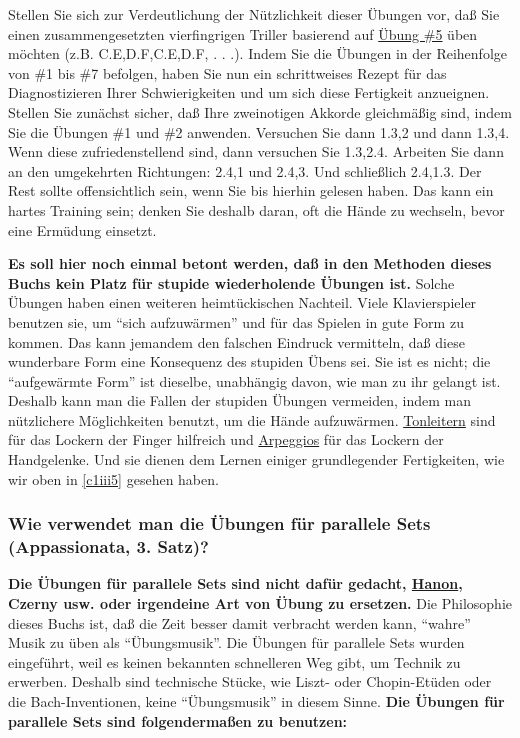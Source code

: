 Stellen Sie sich zur Verdeutlichung der Nützlichkeit dieser Übungen vor, daß Sie einen zusammengesetzten vierfingrigen Triller basierend auf \hyperref[c1iii7b5]{Übung \#5} üben möchten (z.B. C.E,D.F,C.E,D.F, . . .).
Indem Sie die Übungen in der Reihenfolge von \#1 bis \#7 befolgen, haben Sie nun ein schrittweises Rezept für das Diagnostizieren Ihrer Schwierigkeiten und um sich diese Fertigkeit anzueignen.
Stellen Sie zunächst sicher, daß Ihre zweinotigen Akkorde gleichmäßig sind, indem Sie die Übungen \#1 und \#2 anwenden.
Versuchen Sie dann 1.3,2 und dann 1.3,4.
Wenn diese zufriedenstellend sind, dann versuchen Sie 1.3,2.4.
Arbeiten Sie dann an den umgekehrten Richtungen: 2.4,1 und 2.4,3. Und schließlich 2.4,1.3.
Der Rest sollte offensichtlich sein, wenn Sie bis hierhin gelesen haben.
Das kann ein hartes Training sein; denken Sie deshalb daran, oft die Hände zu wechseln, bevor eine Ermüdung einsetzt.

\textbf{Es soll hier noch einmal betont werden, daß in den Methoden dieses Buchs kein Platz für stupide wiederholende Übungen ist.}
Solche Übungen haben einen weiteren heimtückischen Nachteil.
Viele Klavierspieler benutzen sie, um \enquote{sich aufzuwärmen} und für das Spielen in gute Form zu kommen.
Das kann jemandem den falschen Eindruck vermitteln, daß diese wunderbare Form eine Konsequenz des stupiden Übens sei.
Sie ist es nicht; die \enquote{aufgewärmte Form} ist dieselbe, unabhängig davon, wie man zu ihr gelangt ist.
Deshalb kann man die Fallen der stupiden Übungen vermeiden, indem man nützlichere Möglichkeiten benutzt, um die Hände aufzuwärmen.
\hyperref[c1iii5a]{Tonleitern} sind für das Lockern der Finger hilfreich und \hyperref[c1iii5e]{Arpeggios} für das Lockern der Handgelenke.
Und sie dienen dem Lernen einiger grundlegender Fertigkeiten, wie wir oben in \hyperref[c1iii5]{\autoref{c1iii5}} gesehen haben.


\subsubsection{Wie verwendet man die Übungen für parallele Sets (Appassionata, 3. Satz)?}
\label{c1iii7c}

\textbf{Die Übungen für parallele Sets sind nicht dafür gedacht, \hyperref[c1iii7h]{Hanon}, Czerny usw. oder irgendeine Art von Übung zu ersetzen.}
Die Philosophie dieses Buchs ist, daß die Zeit besser damit verbracht werden kann, \enquote{wahre} Musik zu üben als \enquote{Übungsmusik}.
Die Übungen für parallele Sets wurden eingeführt, weil es keinen bekannten schnelleren Weg gibt, um Technik zu erwerben.
Deshalb sind technische Stücke, wie Liszt- oder Chopin-Etüden oder die Bach-Inventionen, keine \enquote{Übungsmusik} in diesem Sinne.
\textbf{Die Übungen für parallele Sets sind folgendermaßen zu benutzen:}

